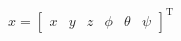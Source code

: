 \documentclass[border=3pt]{standalone}
\begin{document}
{\fontsize{22}{27}\selectfont \color{black}$\displaystyle x=\begin{bmatrix}x&y&z&\phi&\theta&\psi\end{bmatrix}^{\mathrm{T}}$}
\end{document}
